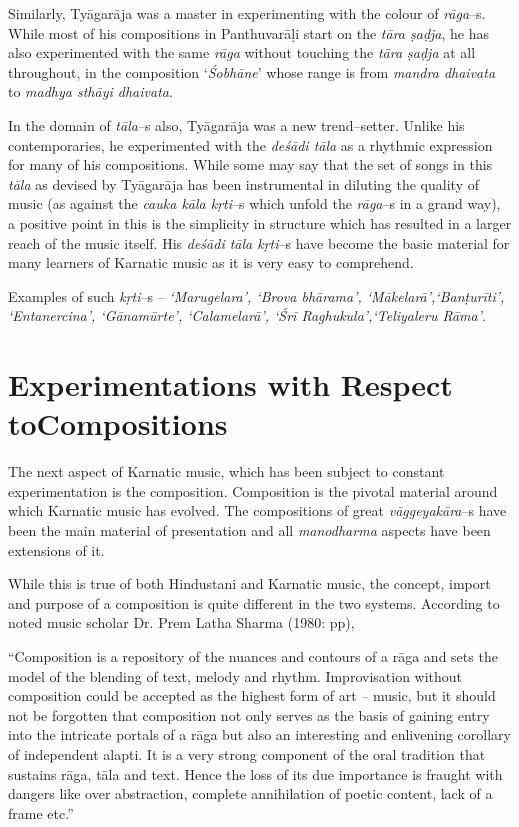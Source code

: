 Similarly, Tyāgarāja was a master in experimenting with the colour of \textit{rāga}–s. While most of his compositions in Panthuvarāḷi start on the \textit{tāra ṣaḍja}, he has also experimented with the same \textit{rāga} without touching the \textit{tāra ṣaḍja} at all throughout, in the composition ‘\textit{Śobhāne}’ whose range is from \textit{mandra dhaivata} to \textit{madhya sthāyi dhaivata}.

In the domain of \textit{tāla}–s also, Tyāgarāja was a new trend–setter. Unlike his contemporaries, he experimented with the \textit{deśādi tāla} as a rhythmic expression for many of his compositions. While some may say that the set of songs in this \textit{tāla} as devised by Tyāgarāja has been instrumental in diluting the quality of music (as against the \textit{cauka kāla kṛti}–s which unfold the \textit{rāga}–s in a grand way), a positive point in this is the simplicity in structure which has resulted in a larger reach of the music itself. His \textit{deśādi tāla kṛti}–s have become the basic material for many learners of Karnatic music as it is very easy to comprehend.

Examples of such \textit{kṛti}–s – \textit{‘Marugelara’, ‘Brova bhārama’, ‘Mākelarā’,\break ‘Banṭurīti’, ‘Entanercina’, ‘Gānamūrte’, ‘Calamelarā’, ‘Śrī Raghukula’,\break ‘Teliyaleru Rāma’}.

\newpage

\section*{Experimentations with Respect to\hfill \break Compositions}

The next aspect of Karnatic music, which has been subject to constant experimentation is the composition. Composition is the pivotal material around which Karnatic music has evolved. The compositions of great \textit{vāggeyakāra}–s have been the main material of presentation and all \textit{manodharma} aspects have been extensions of it.

While this is true of both Hindustani and Karnatic music, the concept, import and purpose of a composition is quite different in the two systems. According to noted music scholar Dr. Prem Latha Sharma (1980: pp),

\begin{myquote}
“Composition is a repository of the nuances and contours of a rāga and sets the model of the blending of text, melody and rhythm. Improvisation without composition could be accepted as the highest form of art – music, but it should not be forgotten that composition not only serves as the basis of gaining entry into the intricate portals of a rāga but also an interesting and enlivening corollary of independent alapti. It is a very strong component of the oral tradition that sustains rāga, tāla and text. Hence the loss of its due importance is fraught with dangers like over abstraction, complete annihilation of poetic content, lack of a frame etc.”
\end{myquote}

